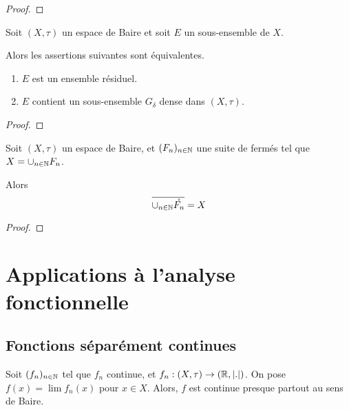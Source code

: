 \ifdefined\outputproof
\begin{proof}

\end{proof}
\fi

\begin{proposition}
	Soit $(X, \tau)$ un espace de Baire et soit $E$ un sous-ensemble de $X$.

	Alors les assertions suivantes sont équivalentes.
	\begin{enumerate}
		\item $E$ est un ensemble résiduel.
		\item $E$ contient un sous-ensemble $G_{\delta}$ dense dans $(X, \tau)$.
	\end{enumerate}
\end{proposition}

\ifdefined\outputproof
\begin{proof}

\end{proof}
\fi

 \begin{proposition}
	Soit $(X, \tau)$ un espace de Baire, et $(F_{n})_{n \in \mathbb{N}}$ une
	suite de fermés tel que $X = \displaystyle\cup_{n \in \mathbb{N}}F_{n}$.

	Alors
	\begin{equation}
		\displaystyle \overline{\cup_{n \in \mathbb{N}}\mathring{F_{n}}} = X
	\end{equation}
\end{proposition}

\ifdefined\outputproof
\begin{proof}

\end{proof}
\fi

\section{Applications à l'analyse fonctionnelle}

\subsection{Fonctions séparément continues}

\begin{theorem}
	\label{first_category_set_theorem_continued_function}
	Soit $(f_{n})_{n \in \mathbb{N}}$ tel que $f_{n}$ continue, et $f_{n} :
	(X, \tau) \rightarrow (\mathbb{R}, |.|)$.
	On pose $f(x) = \lim f_{n}(x)$ pour $x \in X$. Alors, $f$ est continue
	presque partout au sens de Baire.
\end{theorem}

